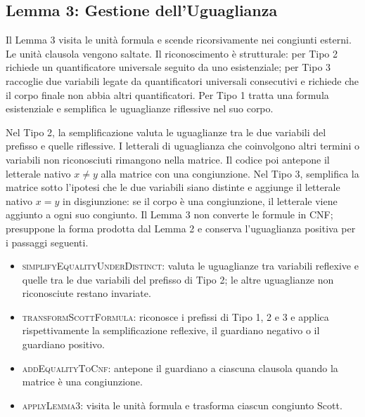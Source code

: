 

\subsection{Lemma 3: Gestione dell'Uguaglianza }
\label{subsec:lemma3_impl}

Il Lemma 3 visita le unità formula e scende ricorsivamente nei congiunti esterni. Le unità clausola vengono saltate. Il riconoscimento è strutturale: per Tipo 2 richiede un quantificatore universale seguito da uno esistenziale; per Tipo 3 raccoglie due variabili legate da quantificatori universali consecutivi e richiede che il corpo finale non abbia altri quantificatori. Per Tipo 1 tratta una formula esistenziale e semplifica le uguaglianze riflessive nel suo corpo.

Nel Tipo 2, la semplificazione valuta le uguaglianze tra le due variabili del prefisso e quelle riflessive. I letterali di uguaglianza che coinvolgono altri termini o variabili non riconosciuti rimangono nella matrice. Il codice poi antepone il letterale nativo $x\ne y$ alla matrice con una congiunzione. Nel Tipo 3, semplifica la matrice sotto l'ipotesi che le due variabili siano distinte e aggiunge il letterale nativo $x=y$ in disgiunzione: se il corpo è una congiunzione, il letterale viene aggiunto a ogni suo congiunto. Il Lemma 3 non converte le formule in CNF; presuppone la forma prodotta dal Lemma 2 e conserva l'uguaglianza positiva per i passaggi seguenti.
\begin{itemize}
    \item \textsc{simplifyEqualityUnderDistinct}: valuta le uguaglianze tra variabili reflexive e quelle tra le due variabili del prefisso di Tipo 2; le altre uguaglianze non riconosciute restano invariate.
    
    \item \textsc{transformScottFormula}: riconosce i prefissi di Tipo 1, 2 e 3 e applica rispettivamente la semplificazione reflexive, il guardiano negativo o il guardiano positivo.
    
    \item \textsc{addEqualityToCnf}: antepone il guardiano a ciascuna clausola quando la matrice è una congiunzione.
    \item \textsc{applyLemma3}: visita le unità formula e trasforma ciascun congiunto Scott.
\end{itemize}

